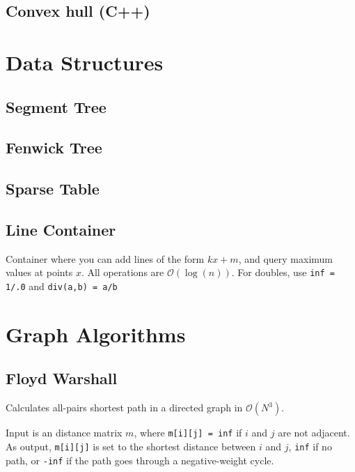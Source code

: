 \documentclass{article}
\begin{document}
\subsection*{Convex hull (C++)}


\section*{Data Structures}

\subsection*{Segment Tree}



\subsection*{Fenwick Tree}


\subsection*{Sparse Table}


\subsection*{Line Container}
Container where you can add lines of the form $kx + m$, and query maximum values at points $x$.
All operations are $\mathcal{O}(\log(n))$. For doubles, use \texttt{inf = 1/.0} and \texttt{div(a,b) = a/b}


\pagebreak

\section*{Graph Algorithms}

\subsection*{Floyd Warshall}

Calculates all-pairs shortest path in a directed graph in $\mathcal{O}(N^3)$.

Input is an distance matrix $m$, where \texttt{m[i][j] = inf} if $i$ and $j$ are not adjacent.
As output, \texttt{m[i][j]} is set to the shortest distance between $i$ and $j$,
\texttt{inf} if no path, or \texttt{-inf} if the path goes through a negative-weight cycle.
\end{document}
